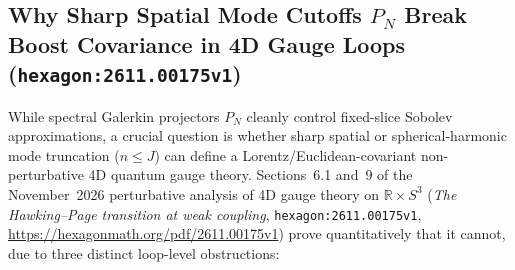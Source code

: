 \subsection{Why Sharp Spatial Mode Cutoffs $P_N$ Break Boost Covariance in 4D Gauge Loops (\texttt{hexagon:2611.00175v1})}
\label{sec:sharp-cutoff-anomaly}

While spectral Galerkin projectors $P_N$ cleanly control fixed-slice Sobolev approximations, a crucial question is whether sharp spatial or spherical-harmonic mode truncation ($n \le J$) can define a Lorentz/Euclidean-covariant non-perturbative 4D quantum gauge theory. Sections~6.1 and~9 of the November~2026 perturbative analysis of 4D gauge theory on $\mathbb{R}\times S^3$ (\emph{The Hawking--Page transition at weak coupling}, \texttt{hexagon:2611.00175v1}, \url{https://hexagonmath.org/pdf/2611.00175v1}) prove quantitatively that it cannot, due to three distinct loop-level obstructions:
